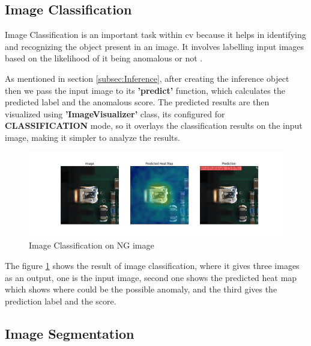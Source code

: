 \subsection{Image Classification}
\label{subsec:Image Classification}

Image Classification is an important task within \gls{cv} because it helps in identifying and recognizing the object present in an image. It involves labelling input images based on the likelihood of it being anomalous or not \cite{FANG2020100980}.

As mentioned in section \ref{subsec:Inference}, after creating the inference object then we pass the input image to its \textbf{'predict'} function, which calculates the predicted label and the anomalous score. The predicted results are then visualized using \textbf{'ImageVisualizer'} class, its configured for \textbf{CLASSIFICATION} mode, so it overlays the classification results on the input image, making it simpler to analyze the results.

\begin{figure}[ht!]
    \centering
    \includegraphics[width=1\linewidth]{Images/anomalous_image_classification.jpg}
    \caption{Image Classification on NG image}
    \label{fig:Image classification on NG image}
\end{figure}

The figure \ref{fig:Image classification on NG image} shows the result of image classification, where it gives three images as an output, one is the input image, second one shows the predicted heat map which shows where could be the possible anomaly, and the third gives the prediction label and the score.

\subsection{Image Segmentation}

